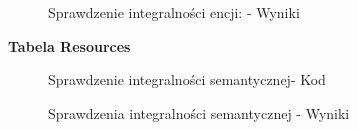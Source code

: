 \begin{figure}[H]
    \centering
    \caption{Sprawdzenie integralności encji: - Wyniki}
\end{figure}
\newpage
\textbf{Tabela Resources}
\begin{figure}[H]
    \centering
    \caption{Sprawdzenie integralności semantycznej- Kod}
\end{figure}
\begin{figure}[H]
    \centering
    \caption{Sprawdzenia integralności semantycznej - Wyniki}
\end{figure}
